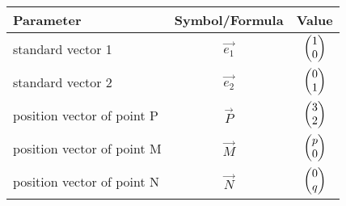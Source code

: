 \begin{tabular}{|l|c|c|}

\hline
\textbf{Parameter} & \textbf{Symbol/Formula} & \textbf{Value} \\
\hline
standard vector 1 & $\vec{e_1}$ & $\begin{pmatrix}1\\0\end{pmatrix}$ \\
\hline
standard vector 2 & $\vec{e_2}$ & $\begin{pmatrix}0\\1\end{pmatrix}$ \\
\hline
position vector of point P & $\vec{P}$ & $\begin{pmatrix}3\\2\end{pmatrix}$ \\
\hline
position vector of point M & $\vec{M}$ & $\begin{pmatrix}p\\0\end{pmatrix}$\\
\hline
position vector of point N & $\vec{N}$ & $\begin{pmatrix}0\\q\end{pmatrix}$\\
\hline

\end{tabular}
